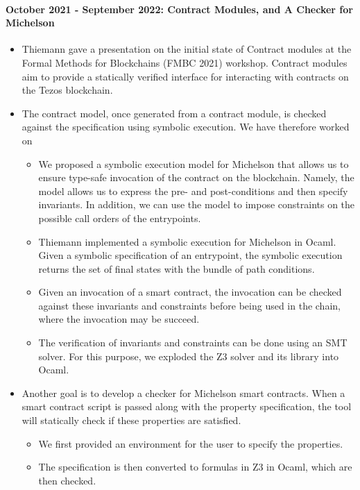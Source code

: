 \documentclass[a4paper,11pt]{article}
\begin{document}
\paragraph{October 2021 - September 2022: Contract Modules, and A Checker for Michelson}
\begin{itemize}
\item Thiemann gave a presentation on the initial state of Contract modules at the Formal Methods for Blockchains (FMBC 2021) workshop. Contract modules aim to provide a statically verified interface for interacting with contracts on the Tezos blockchain.
\item The contract model, once generated from a contract module, is checked against the specification using symbolic execution. We have therefore worked on

\begin{itemize}
\item We proposed a symbolic execution model for Michelson that allows us to ensure type-safe invocation of the contract on the blockchain. Namely, the model allows us to express the pre- and post-conditions and then specify invariants. In addition, we can use the model to impose constraints on the possible call orders of the entrypoints.
\item Thiemann implemented a symbolic execution for Michelson in Ocaml. Given a symbolic specification of an entrypoint, the symbolic execution returns the set of final states with the bundle of path conditions. 
\item Given an invocation of a smart contract, the invocation can be checked against these invariants and constraints before being used in the chain, where the invocation may be succeed. 
\item The verification of invariants and constraints can be done using an SMT solver. For this purpose, we exploded the Z3 solver and its library into Ocaml.
\end{itemize}

\item Another goal is to develop a checker for Michelson smart contracts. When a smart contract script is passed along with the property specification, the tool will statically check if these properties are satisfied.
\begin{itemize}
\item We first provided an environment for the user to specify the properties. 
\item The specification is then converted to formulas in Z3 in Ocaml, which are then checked.  
\end{itemize}

\end{itemize}
\end{document}
